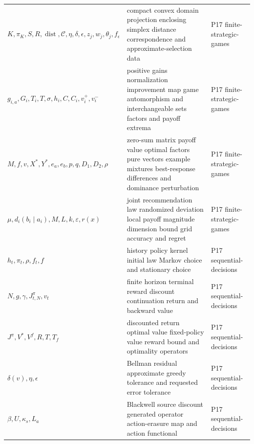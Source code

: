 \begin{longtable}{@{}p{}p{}p{}@{}}
\(K,\allowbreak \pi_K,\allowbreak S,\allowbreak R,\allowbreak \operatorname{dist},\allowbreak \mathcal C,\allowbreak \eta,\allowbreak \delta,\allowbreak \epsilon,\allowbreak z_j,\allowbreak w_j,\allowbreak \theta_j,\allowbreak f_\epsilon\) & compact convex domain projection enclosing simplex distance correspondence and approximate-selection data & P17 finite-\allowbreak{}strategic-\allowbreak{}games \\
\(g_{i,a},\allowbreak G_i,\allowbreak T_i,\allowbreak T,\allowbreak \sigma,\allowbreak h_i,\allowbreak C,\allowbreak C_i,\allowbreak v_i^+,\allowbreak v_i^-\) & positive gains normalization improvement map game automorphism and interchangeable sets factors and payoff extrema & P17 finite-\allowbreak{}strategic-\allowbreak{}games \\
\(M,\allowbreak f,\allowbreak v,\allowbreak X^*,\allowbreak Y^*,\allowbreak e_a,\allowbreak e_b,\allowbreak p,\allowbreak q,\allowbreak D_1,\allowbreak D_2,\allowbreak \rho\) & zero-sum matrix payoff value optimal factors pure vectors example mixtures best-response differences and dominance perturbation & P17 finite-\allowbreak{}strategic-\allowbreak{}games \\
\(\mu,\allowbreak d_i(b_i\mid a_i),\allowbreak M,\allowbreak L,\allowbreak k,\allowbreak \varepsilon,\allowbreak r(x)\) & joint recommendation law randomized deviation local payoff magnitude dimension bound grid accuracy and regret & P17 finite-\allowbreak{}strategic-\allowbreak{}games \\
\(h_t,\allowbreak \pi_t,\allowbreak \rho,\allowbreak f_t,\allowbreak f\) & history policy kernel initial law Markov choice and stationary choice & P17 sequential-\allowbreak{}decisions \\
\(N,\allowbreak g,\allowbreak \gamma,\allowbreak J_{t,N}^{\pi},\allowbreak v_t\) & finite horizon terminal reward discount continuation return and backward value & P17 sequential-\allowbreak{}decisions \\
\(J^\pi,\allowbreak V^*,\allowbreak V^f,\allowbreak R,\allowbreak T,\allowbreak T_f\) & discounted return optimal value fixed-policy value reward bound and optimality operators & P17 sequential-\allowbreak{}decisions \\
\(\delta(v),\allowbreak \eta,\allowbreak \epsilon\) & Bellman residual approximate greedy tolerance and requested error tolerance & P17 sequential-\allowbreak{}decisions \\
\(\beta,\allowbreak U,\allowbreak \kappa_s,\allowbreak L_a\) & Blackwell source discount generated operator action-erasure map and action functional & P17 sequential-\allowbreak{}decisions \\

\end{longtable}
